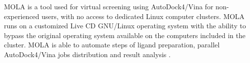 MOLA is a tool used for virtual screening using AutoDock4/Vina for non-experienced users, with no access to dedicated Linux computer clusters. MOLA runs on a customized Live CD GNU/Linux operating system with the ability to bypass the original operating system available on the computers included in the cluster. MOLA is able to automate steps of ligand preparation, parallel AutoDock4/Vina jobs distribution and result analysis \cite{Abreu_2010}.